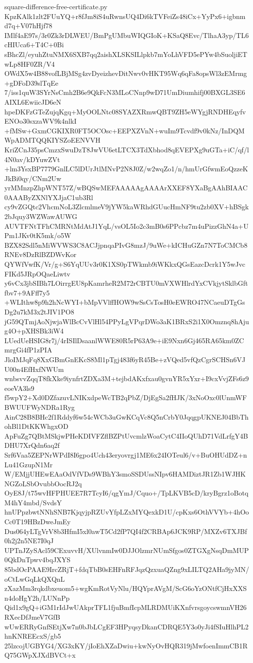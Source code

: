 \documentclass[11pt]{article}
\theoremstyle{definition}
\theoremstyle{remark}
\begin{document}
\begin{filecontents*}[overwrite]{square-difference-free-certificate.py}
KpzKAlk1zlt2FUuYQ+r8fJm8iS4uRwnsUQ4Di6kTVFeiZs48iCx+YyPx6+igbnmd7q+V07hHjf78
IMlf4aE97s/3r0Zk3rDLWEU/BmPgUMbuWIQGIoK+KSaQ8Evc/TlhaA3yp/TL6cHIUca6+T4C+0Bi
sBhcZl/eyuhZtuNMX6SXB7qq2aishXLSKSILlpkb7mYoLhVFD5ePYw4bSuoljiETwLp8HF0ZR/V4
OWdX5w4B88vofLBjMSg4zvDyeizhevDitNwv0vHKT95Wq6qFa8opsWl3zEMrmg+gDFoD39slTqEe
7/iss1quW3SYrNsCmh2B6e9QkFcN3MLoCNnp9wD71UmDiumhifj00BXGL3SE6AIXL6EwiicJD6eN
hpeDKFzGTeZujqKgq+MyOOLNtc08SYAZXRmwQBT9ZH5eWYgjRNDHEqyfvENOo30sxzaWV9k4nlkI
+fMSw+GxmCGKIXR0FT5OCOsc+EEPXZVnN+wuIm9Tcvdf9v0kNz/InDQMWpADMTQQKIYSZoEENVVH
KriZCnJ35psCmzxSwuDzT8JwVU6etLTCX3TdXbhod8qEVEPXg9uGTa+iC/qf/l4N0av/kDYuwZVt
+lm3YsxBP7779GnlLC5lDUrJtlMNvP2N8J0Z/w2wqZo1/n/hmUrGfwmEoQzzeKJkBi0qy/CNm2Uw
yrMMnzpZhpWNT57Z/wBQSwMEFAAAAAgAAAArXXEF8YXaBgAAhBIAAC0AAAByZXNlYXJjaC1ub3Rl
cy9vZGQtc2VhcmNoL3ZlcmlmeV9jYW5kaWRhdGUucHmNF9tu2zb0XV+hBSgk2bJquy3WZWawAUWG
AUVTFNtTFhCMRNtMdAtJ1YqL/vsOL5Io2c3mB0s6PPcbz7m4uPizzGhN4a+UPm1JKv0tK5mk/o5W
BZX82Sdl5nMiWVWS3C8ACJjpnqaPIvG8mzJ/9uWe+kICHuGZn7N7ToCMCb8RNEv8DzRlBZDWvKor
QYWfVwfK/Vr/g+S6YqUUv3r0K1XS0pTWkmb9iWKkxQGsEazcDcrk1Y5wJvcFIKd5JRpOQaeLiwtv
y6vCx3jbSIBh7LOirrgEU8pKamrheR2M72rCBTU0mVXWHlrdYxCVkjytSklbGftfbv7+9AFff7y5
+WLIthw8p9h2hNcWYI+bMpVVlffHOW9wSsCsTosH0eEWRO47NCaeuDTgGsDg2u7kM3x2tJIV1PO8
jG59QTmjAoNjwjaWlBcCvVlHl54PPyLgVPqrDWo3aK1BRxS2i1X0Omznq8hAjug4O+pXHSBk3iW4
LUedUeHSIG8r7j/4rISIlDsaanlWWE80R5rP63A9e+iE9Nxn6Gj465RA65km0ZCmrgGi4fP1zPIA
JloIMJqFq8XxGBmGnEKcS8Ml1pTgj483f6yR45Be+zVQed5vfQzCgrSCHSn6VJU00n4EfHxfNWUm
wnbsvvZqqT8fkXke9iynfrtZDXa3M+tejbdAKxfxau0gvnYR5xYxr+I9cxVvjZFs6z9eoeVA3ls9
f5wpY2+Xd0DZfazuvLNIKxdpeWcTB2qPbZ/DjEgSa2fHJK/3xNoOxc0lUnmWFBWUUFWyNDRa1Ryg
AinC28B8BHc2f1Rddyf6w54cWCb3uGwKCqVc8Q5nCrbY0JqqgpUKNEJ04BbThohBl1DtKKWhgxOD
ApFuZg7QBtMSkjwPHeKDIVFZflBZPtUvcmlzWoaCytC4IIoQUhD71VdLrfgY4BDHU7XrQdn6aq2f
Srf6Vaa5ZEPNrWPdI8I6gpo4Uch43eryovrgj1ME6x24IOTeul6/v+BuOHUdDZ+nLu41GzupN1Mr
W/EMjjUHEwEAaOdVfVDs9WBhY3smoSSDUssNIpv6HAMDiztJR1Zb1WJHKNGZoLSbOvubbOocRJ2q
OyE8J/t75wvHFPHUEE7R7TcyI6/qgYmJ/Cquo+/TpLKVB5cD/kryBgrz1oBotqM4hY4mbd/SvdsY
hnUPpzbwtNNhSNB7KjqyjpRZUvYfpLZxMYQexkD1U/cpKxs6OthVVYb+4hOoCc0T19HBzDweJmEy
Dus064yLTgVrV8b3HfmI5xl0awT5Cd2fP7QI4f2CRBAp6JCK9RP/MXZv6TXJBf0h2j2n5NE7I0qJ
UPTnJZySAcl59CExuvvH/XUlvnmIw0DJJOlzmrNUmSfgos0ZTGXgNsqDmMUP0QkDnTpwv4bqJXYS
85bdOcPAAE9IrcZRjT+fdqTbB0sEHFnRFJqzQzxuaQZng9xLILTQ2AHa9jyMN/oCtLwGqLkQXQnL
zXazMm3rqkdbxeuom5+wgKmRotVyNlu/HQYprAVgM/ScG6oYzONtfCjHxXXSn4doHgY2h/LUNnPp
Qid1x9gQ+iGM1rIdJwUAkprTFL1fjuBmfIcpMLRDMUiKXnfvrsgoycswmnVH26RXecDfJmeV7GfB
wUwERRyGnfSEtjXw7n0bJbLCgEF3HPyqsyDkanCDRQE5Y3o0yJi4fSIuHlhPL2hnKNREEcxS/gb5
25lzcojUGBYG4/XG3xKY/jIoEhXZaDwiu+kwNyOvHQR319jMwfoenImmCB1RQ75GWpXJXdBVCt+x

\end{filecontents*}
\end{document}
